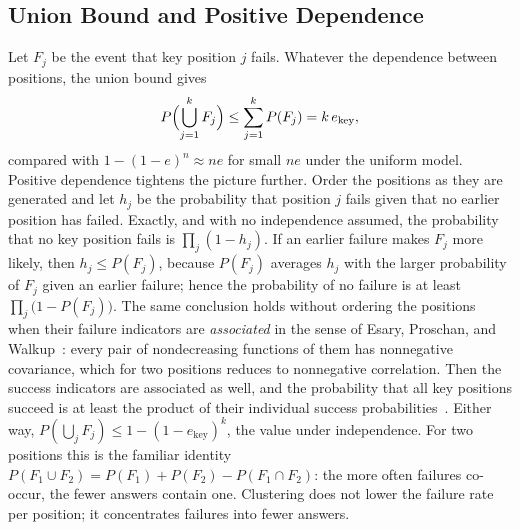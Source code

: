 \documentclass{ieeeaccess}
\begin{document}
\subsection{Union Bound and Positive Dependence}
\label{app:union}
Let $F_j$ be the event that key position $j$ fails. Whatever the dependence between positions, the union bound gives
\begin{equation}
P\Bigl(\bigcup_{j=1}^{k} F_j\Bigr) \le \sum_{j=1}^{k} P(F_j) = k\, e_{\text{key}},
\end{equation}
compared with $1-(1-e)^{n} \approx n e$ for small $ne$ under the uniform model. Positive dependence tightens the picture further. Order the positions as they are generated and let $h_j$ be the probability that position $j$ fails given that no earlier position has failed. Exactly, and with no independence assumed, the probability that no key position fails is $\prod_j (1-h_j)$. If an earlier failure makes $F_j$ more likely, then $h_j \le P(F_j)$, because $P(F_j)$ averages $h_j$ with the larger probability of $F_j$ given an earlier failure; hence the probability of no failure is at least $\prod_j \bigl(1-P(F_j)\bigr)$. The same conclusion holds without ordering the positions when their failure indicators are \emph{associated} in the sense of Esary, Proschan, and Walkup~\cite{esary1967association}: every pair of nondecreasing functions of them has nonnegative covariance, which for two positions reduces to nonnegative correlation. Then the success indicators are associated as well, and the probability that all key positions succeed is at least the product of their individual success probabilities~\cite[Th.~4.1]{esary1967association}. Either way, $P(\bigcup_j F_j) \le 1-(1-e_{\text{key}})^{k}$, the value under independence. For two positions this is the familiar identity $P(F_1\cup F_2) = P(F_1)+P(F_2)-P(F_1\cap F_2)$: the more often failures co-occur, the fewer answers contain one. Clustering does not lower the failure rate per position; it concentrates failures into fewer answers.
\end{document}
